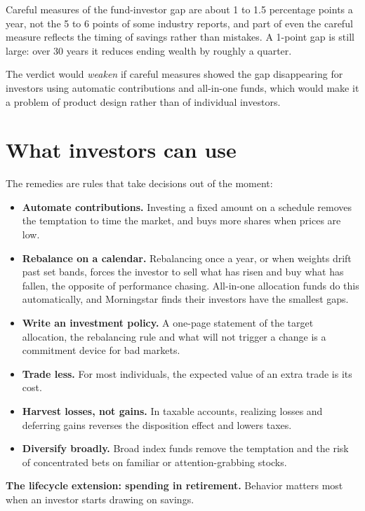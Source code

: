Careful measures of the fund-investor gap are about 1 to 1.5 percentage points a year, not the 5 to 6 points of some industry reports, and part of even the careful measure reflects the timing of savings rather than mistakes. A 1-point gap is still large: over 30 years it reduces ending wealth by roughly a quarter.

The verdict would \emph{weaken} if careful measures showed the gap disappearing for investors using automatic contributions and all-in-one funds, which would make it a problem of product design rather than of individual investors.

\section{What investors can use}
\label{sec:24-investors}

The remedies are rules that take decisions out of the moment:

\begin{itemize}
  \item \textbf{Automate contributions.} Investing a fixed amount on a schedule removes the temptation to time the market, and buys more shares when prices are low.
  \item \textbf{Rebalance on a calendar.} Rebalancing once a year, or when weights drift past set bands, forces the investor to sell what has risen and buy what has fallen, the opposite of performance chasing. All-in-one allocation funds do this automatically, and Morningstar finds their investors have the smallest gaps.
  \item \textbf{Write an investment policy.} A one-page statement of the target allocation, the rebalancing rule and what will not trigger a change is a commitment device for bad markets.
  \item \textbf{Trade less.} For most individuals, the expected value of an extra trade is its cost.
  \item \textbf{Harvest losses, not gains.} In taxable accounts, realizing losses and deferring gains reverses the disposition effect and lowers taxes.
  \item \textbf{Diversify broadly.} Broad index funds remove the temptation and the risk of concentrated bets on familiar or attention-grabbing stocks.
\end{itemize}

\textbf{The lifecycle extension: spending in retirement.} Behavior matters most when an investor starts drawing on savings.

